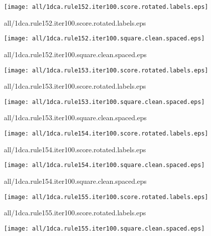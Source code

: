 \documentclass{article}
\begin{document}
\begin{center}
\begin{minipage}{\textwidth}
\texttt{[image: all/1dca.rule152.iter100.score.rotated.labels.eps]}
\end{minipage}
\end{center}
{\footnotesize all/1dca.rule152.iter100.score.rotated.labels.eps}
\begin{center}
\begin{minipage}{\textwidth}
\texttt{[image: all/1dca.rule152.iter100.square.clean.spaced.eps]}
\end{minipage}
\end{center}
{\footnotesize all/1dca.rule152.iter100.square.clean.spaced.eps}
\begin{center}
\begin{minipage}{\textwidth}
\texttt{[image: all/1dca.rule153.iter100.score.rotated.labels.eps]}
\end{minipage}
\end{center}
{\footnotesize all/1dca.rule153.iter100.score.rotated.labels.eps}
\begin{center}
\begin{minipage}{\textwidth}
\texttt{[image: all/1dca.rule153.iter100.square.clean.spaced.eps]}
\end{minipage}
\end{center}
{\footnotesize all/1dca.rule153.iter100.square.clean.spaced.eps}
\begin{center}
\begin{minipage}{\textwidth}
\texttt{[image: all/1dca.rule154.iter100.score.rotated.labels.eps]}
\end{minipage}
\end{center}
{\footnotesize all/1dca.rule154.iter100.score.rotated.labels.eps}
\begin{center}
\begin{minipage}{\textwidth}
\texttt{[image: all/1dca.rule154.iter100.square.clean.spaced.eps]}
\end{minipage}
\end{center}
{\footnotesize all/1dca.rule154.iter100.square.clean.spaced.eps}
\begin{center}
\begin{minipage}{\textwidth}
\texttt{[image: all/1dca.rule155.iter100.score.rotated.labels.eps]}
\end{minipage}
\end{center}
{\footnotesize all/1dca.rule155.iter100.score.rotated.labels.eps}
\begin{center}
\begin{minipage}{\textwidth}
\texttt{[image: all/1dca.rule155.iter100.square.clean.spaced.eps]}
\end{minipage}
\end{center}
\end{document}
